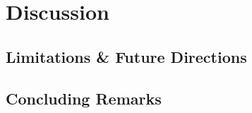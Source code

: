 \section{Discussion}


\subsection{Limitations \& Future Directions}


\subsection{Concluding Remarks}

